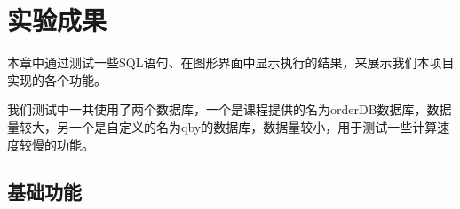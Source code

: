 
\chapter{实验成果} %

\label{Chapter4}

本章中通过测试一些SQL语句、在图形界面中显示执行的结果，来展示我们本项目实现的各个功能。

我们测试中一共使用了两个数据库，一个是课程提供的名为orderDB数据库，数据量较大，另一个是自定义的名为qby的数据库，数据量较小，用于测试一些计算速度较慢的功能。

\section{基础功能}

